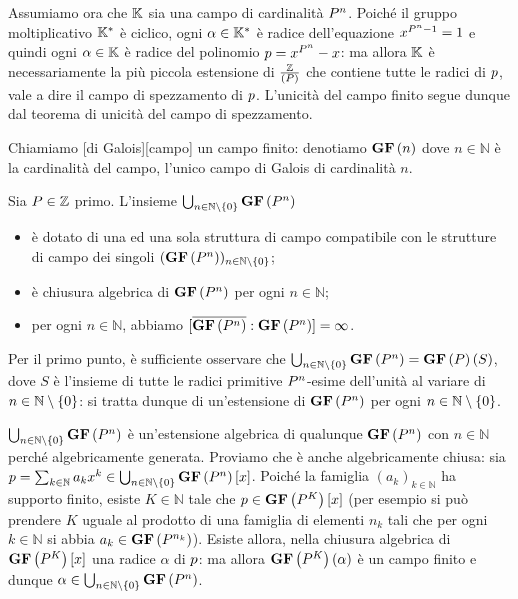 \par Assumiamo ora che $\mathbb{K}$ sia una campo di cardinalit\`a $P^n$. Poich\'e il gruppo moltiplicativo $\mathbb{K}^*$ \`e ciclico, ogni $\alpha \in \mathbb{K}^*$ \`e radice dell'equazione $x^{P^n - 1} = 1$ e quindi ogni $\alpha \in \mathbb{K}$ \`e radice del polinomio $p = x^{P^n} - x$: ma allora $\mathbb{K}$ \`e necessariamente la pi\`u piccola estensione di $\frac{\mathbb{Z}}{\left ( P \right )}$ che contiene tutte le radici di $p$, vale a dire il campo di spezzamento di $p$. L'unicit\`a del campo finito segue dunque dal teorema di unicit\`a del campo di spezzamento. \EndProof
\begin{Definition}
	Chiamiamo [di Galois][campo] un campo finito: denotiamo $\textbf{GF} \left ( n \right )$ dove $n \in \mathbb{N}$ \`e la cardinalit\`a del campo, l'unico campo di Galois di cardinalit\`a $n$.
\end{Definition}
\begin{Theorem}
	Sia $P \in \mathbb{Z}$ primo.
	L'insieme $\bigcup_{n \in \mathbb{N} \setminus \lbrace 0 \rbrace}
	\textbf{GF} \left ( P^n \right )$
	\begin{itemize}
		\item \`e dotato di una ed una sola struttura di campo
		compatibile con le strutture di campo dei singoli
		$(\textbf{GF} \left ( P^n \right ))_{n \in \mathbb{N} \setminus \lbrace 0 \rbrace}$;
		\item \`e chiusura algebrica di $\textbf{GF} \left ( P^n \right )$
		per ogni $n \in \mathbb{N}$;
		\item per ogni $n \in \mathbb{N}$, abbiamo
		$[\overline{\textbf{GF} \left ( P^n \right )}:\textbf{GF} \left ( P^n \right )] = \infty$.
	\end{itemize}
\end{Theorem}
\Proof Per il primo punto, \`e sufficiente osservare che $\bigcup_{n \in \mathbb{N} \setminus \lbrace 0 \rbrace} \textbf{GF} \left ( P^n \right ) = \textbf{GF} \left ( P \right ) \left ( S \right )$, dove $S$ \`e l'insieme di tutte le radici primitive $P^n$-esime dell'unit\`a al variare di $n \in \mathbb{N} \setminus \lbrace 0 \rbrace$: si tratta dunque di un'estensione di $\textbf{GF} \left ( P^n \right )$ per ogni $n \in \mathbb{N} \setminus \lbrace 0 \rbrace$.
\par $\bigcup_{n \in \mathbb{N} \setminus \lbrace 0 \rbrace} \textbf{GF} \left ( P^n \right )$ \`e un'estensione algebrica di qualunque $\textbf{GF} \left ( P^n \right )$ con $n \in \mathbb{N}$ perch\'e algebricamente generata. Proviamo che \`e anche algebricamente chiusa: sia $p = \sum_{k \in \mathbb{N}} a_kx^k \in \bigcup_{n \in \mathbb{N} \setminus \lbrace 0 \rbrace} \textbf{GF} \left ( P^n \right ) \left [ x \right ]$. Poich\'e la famiglia $(a_k)_{k \in \mathbb{N}}$ ha supporto finito, esiste $K \in \mathbb{N}$ tale che $p \in \textbf{GF} \left ( P^K \right ) \left [ x \right ]$ (per esempio si pu\`o prendere $K$ uguale al prodotto di una famiglia di elementi $n_k$ tali che per ogni $k \in \mathbb{N}$ si abbia $a_k \in \textbf{GF} \left ( P^{n_k} \right )$). Esiste allora, nella chiusura algebrica di $\textbf{GF} \left ( P^K \right ) \left [ x \right ]$ una radice $\alpha$ di $p$: ma allora $\textbf{GF} \left ( P^K \right ) \left ( \alpha \right )$ \`e un campo finito e dunque $\alpha \in \bigcup_{n \in \mathbb{N} \setminus \lbrace 0 \rbrace} \textbf{GF} \left ( P^n \right )$.
